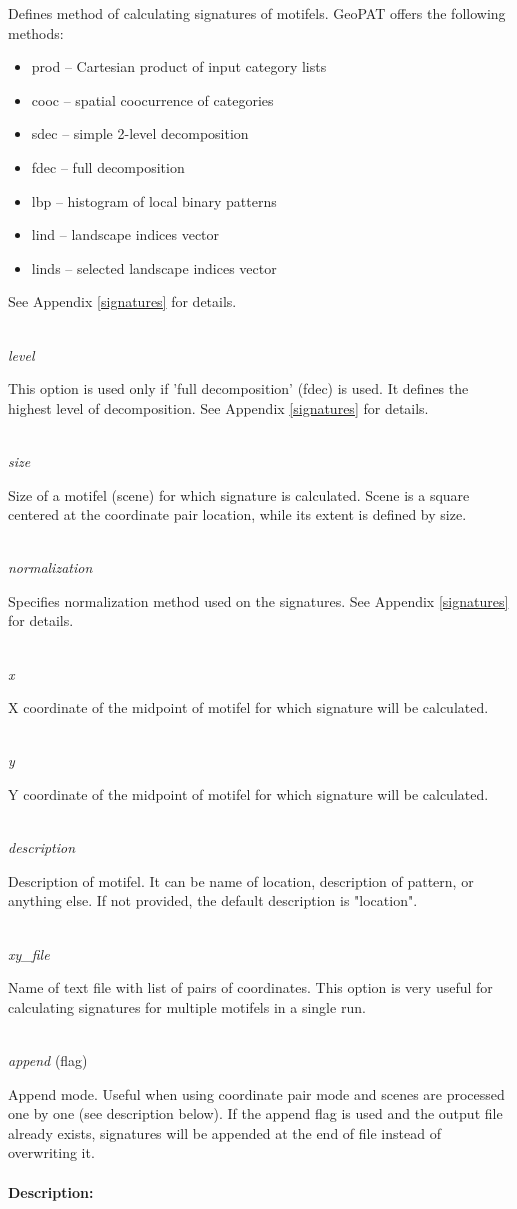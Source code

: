 \documentclass[12pt,margin=0.5in]{article}
\newcommand{\newoption}[1]{\mbox{}\\{\it #1}}
\begin{document}
Defines method of calculating signatures of motifels. GeoPAT offers the following methods: 
\begin{itemize}
	\item prod -- Cartesian product of input category lists
	\item cooc -- spatial coocurrence of categories
	\item sdec -- simple 2-level decomposition
	\item fdec -- full decomposition
	\item lbp -- histogram of local binary patterns
	\item lind -- landscape indices vector
	\item linds -- selected landscape indices vector
\end{itemize}
See Appendix \ref{signatures} for details.

\newoption{level}

This option is used only if 'full decomposition' (fdec) is used. It defines the highest level of decomposition. See Appendix \ref{signatures} for details.

\newoption{size}

Size of a motifel (scene) for which signature is calculated. Scene is a square centered at the coordinate pair location, while its extent is defined by size. 

\newoption{normalization}

Specifies normalization method used on the signatures. See Appendix \ref{signatures} for details.

\newoption{x}

X coordinate of the midpoint of motifel for which signature will be calculated.

\newoption{y}

Y coordinate of the midpoint of motifel for which signature will be calculated.

\newoption{description}

Description of motifel. It can be name of location, description of pattern, or anything else. If not provided, the default description is "location".

\newoption{xy\_file}

Name of text file with list of pairs of coordinates. This option is very useful for calculating signatures for multiple motifels in a single run.

\newoption{append} (flag)

Append mode. Useful when using coordinate pair mode and scenes are processed one by one (see description below). If the append flag is used and the output file already exists, signatures will be appended at the end of file instead of overwriting it.
\\\\
{\bf Description:}
\end{document}
